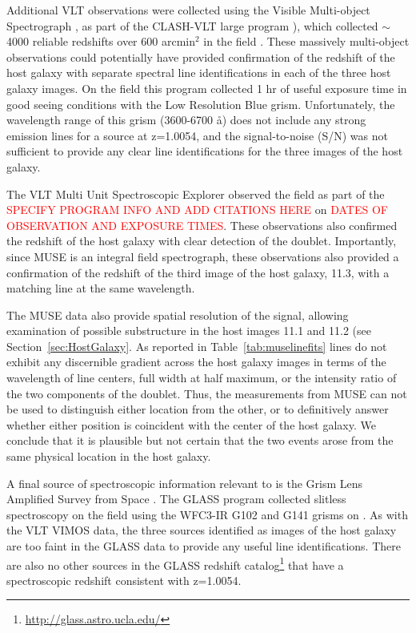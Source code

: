Additional VLT observations were collected using the Visible Multi-object
Spectrograph \citep[VIMOS][]{LeFevre:2003}, as part of the CLASH-VLT large
program \citep[Program 186.A-0.798; P.I.: P. Rosati;][]{Rosati:2014}),
which collected $\sim$4000 reliable redshifts over 600 arcmin$^2$ in
the  field \citep{Grillo:2015a,Balestra:2015}.  These
massively multi-object observations could potentially have provided
confirmation of the redshift of the \spock host galaxy with separate
spectral line identifications in each of the three host galaxy images.
On the  field this program collected 1 hr of useful exposure
time in good seeing conditions with the Low Resolution Blue grism.
Unfortunately, the wavelength range of this grism (3600-6700 \aa) does
not include any strong emission lines for a source at z=1.0054, and
the signal-to-noise (S/N) was not sufficient to provide any clear line
identifications for the three images of the \spock host galaxy.

The VLT Multi Unit Spectroscopic Explorer
\citep[MUSE;][]{Henault:2003,Bacon:2012} observed the  field
as part of the \textcolor{red}{SPECIFY PROGRAM INFO AND ADD CITATIONS
  HERE} on \textcolor{red}{DATES OF OBSERVATION AND EXPOSURE TIMES}.
These observations also confirmed the redshift of the host galaxy with
clear detection of the  doublet.  Importantly, since
MUSE is an integral field spectrograph, these observations also
provided a confirmation of the redshift of the third image of the host
galaxy, 11.3, with a matching  line at the same
wavelength.



The MUSE data also provide spatial resolution of the
 signal, allowing examination of possible
substructure in the host images 11.1 and 11.2 (see
Section~\ref{sec:HostGalaxy}. As reported in
Table~\ref{tab:muselinefits}  lines do not exhibit
any discernible gradient across the host galaxy images in terms of the
wavelength of line centers, full width at half maximum, or the
intensity ratio of the two components of the doublet.  Thus, the
 measurements from MUSE can not be used to
distinguish either \spock location from the other, or to definitively
answer whether either position is coincident with the center of the
host galaxy.  We conclude that it is plausible but not certain that
the two \spock events arose from the same physical location in the
host galaxy.

A final source of spectroscopic information relevant to \spock
is the Grism Lens Amplified Survey from Space \citep[GLASS; PID:
  HST-GO-13459; PI:T. Treu][]{Schmidt:2014,Treu:2015a}. The GLASS
program collected slitless spectroscopy on the  field using
the WFC3-IR G102 and G141 grisms on \HST.  As with the VLT VIMOS data,
the three sources identified as images of the \spock host galaxy are
too faint in the GLASS data to provide any useful line
identifications.  There are also no other sources in the GLASS
redshift catalog\footnote{\url{http://glass.astro.ucla.edu/}} that
have a spectroscopic redshift consistent with z=1.0054.


